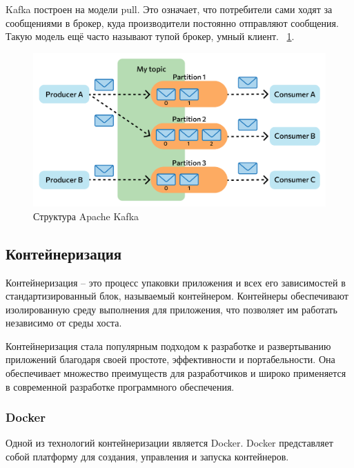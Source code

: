 Kafka построен на модели pull.
Это означает, что потребители сами ходят за сообщениями в брокер, куда производители постоянно отправляют сообщения.
Такую модель ещё часто называют тупой брокер, умный клиент.
~\ref{fig:domain:kafka-model}.

\begin{figure}[ht]
    \centering
    \includegraphics[width=.6\linewidth]{images/kafka_model}
    \caption{Структура Apache Kafka}
    \label{fig:domain:kafka-model}
\end{figure}


\subsection{Контейнеризация}\label{subsec:domain:contenarization}
Контейнеризация -- это процесс упаковки приложения и всех его зависимостей в стандартизированный блок, называемый контейнером.
Контейнеры обеспечивают изолированную среду выполнения для приложения, что позволяет им работать независимо от среды хоста.

Контейнеризация стала популярным подходом к разработке и развертыванию приложений благодаря своей простоте, эффективности и портабельности.
Она обеспечивает множество преимуществ для разработчиков  и широко применяется в современной разработке программного обеспечения.

\subsubsection{Docker}\label{subsubsec:domain:docker}
Одной из технологий контейнеризации является Docker.
Docker\cite{docker_docs} представляет собой платформу для создания, управления и запуска контейнеров.

